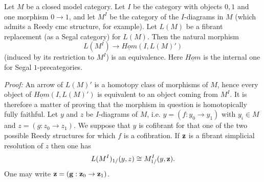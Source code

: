 \begin{lemma}
\label{equivalence2}
Let $M$ be a closed model category. Let $I$ be the category
with objects $0,1$ and one morphism $0\rightarrow 1$, and let $M^I$ be the
category of the $I$-diagrams in $M$ (which admits a Reedy cmc structure, for
example). Let $L(M)$ be a fibrant replacement (as a
Segal category) for $L(M)$. %
Then the natural morphism
$$
L(M^I)\rightarrow \underline{Hom}(I, L(M)')
$$
(induced by its restriction to $M^I$) is an equivalence. Here $\underline{Hom}$
is the internal one for Segal $1$-precategories.
\end{lemma}
{\em Proof:}
An arrow of $L(M)'$ is a homotopy class of morphisms of $M$,
hence every object of $\underline{Hom}(I, L(M)')$ is equivalent to an object
coming from $M^I$. It is therefore a matter of proving that the morphism in
question is
homotopically fully faithful. Let $y$ and $z$ be $I$-diagrams of
$M$, i.e. $y= (f: y_0\rightarrow y_1)$ with $y_i\in M$ and
$z= (g: z_0\rightarrow z_1)$.
We suppose that $y$ is cofibrant for that one
of the two possible Reedy structures for which
$f$ is a cofibration.
If ${\bf z}$ is a fibrant simplicial
resolution of $z$ then one has
$$
L(M^I)_{1/}(y,z) \cong M^I_{1/}(y, {\bf z}).
$$
One may write ${\bf z} = ({\bf g}: {\bf z}_0\rightarrow {\bf z}_1)$.


